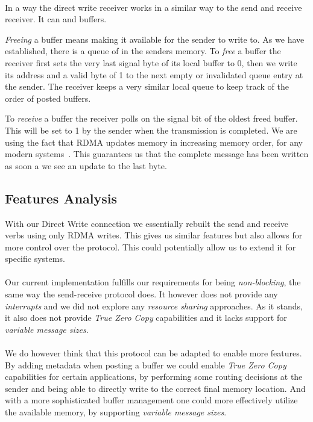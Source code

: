 \paragraph{} In a way the direct write receiver works in a similar way to the send and receive receiver. It can  and 
 buffers. 

\emph{Freeing} a buffer means making it available for the sender to write to. As we have established,  
there is a queue of  in the senders memory. To \emph{free} a buffer the receiver first sets the very last 
signal byte of its local buffer to 0, then we write its address and a valid byte of 1 to the next empty or 
invalidated queue entry at the sender. The receiver keeps a very similar local queue to keep track of the order of 
posted buffers.

To \emph{receive} a buffer the receiver polls on the signal bit of the oldest freed buffer. This will be set
to 1 by the sender when the transmission is completed. We are using the fact that RDMA updates memory in increasing memory 
order, for any modern systems~\cite{herd, farm}. This guarantees us that the complete message has been written as soon a we
see an update to the last byte.

\subsection{Features Analysis}

With our Direct Write connection we essentially rebuilt the send and receive verbs using only RDMA writes. This gives us 
similar features but also allows for more control over the protocol. This could potentially allow us to extend it for 
specific systems.

\paragraph{} Our current implementation fulfills our requirements for being \emph{non-blocking}, the same way the send-receive
protocol does. It however does not provide any \emph{interrupts} and we did not explore any \emph{resource sharing} approaches.
As it stands, it also does not provide \emph{True Zero Copy} capabilities and it lacks support for 
\emph{variable message sizes}.


\paragraph{} We do however think that this protocol can be adapted to enable more features. By adding metadata when posting a
buffer we could enable \emph{True Zero Copy} capabilities for certain applications, by performing some routing decisions at
the sender and being able to directly write to the correct final memory location.
And with a more sophisticated buffer management one could more effectively utilize the available memory, by supporting 
\emph{variable message sizes}.



